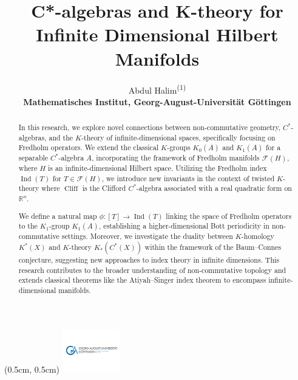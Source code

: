 \documentclass[11pt, twoside, a4paper]{article}
\title{C*-algebras and K-theory for Infinite Dimensional Hilbert Manifolds}
\author{Abdul Halim\textsuperscript{(1)} \\ \textbf{Mathematisches Institut, Georg-August-Universität Göttingen}}
\date{}
\theoremstyle{mytheoremstyle}
\begin{document}
    \begin{titlepage}
    \maketitle
\thispagestyle{titlepage}
    \begin{textblock*}{3cm}(0.5cm, 0.5cm) %
        \includegraphics[width=2.5cm]{uni-goettingen-logo.jpg} %
    \end{textblock*}
\end{titlepage}
\newpage
\vspace*{\fill}
\begin{abstract}
In this research, we explore novel connections between non-commutative geometry, $C^*$-algebras, and the $K$-theory of infinite-dimensional spaces, specifically focusing on Fredholm operators. We extend the classical $K$-groups $K_0(A)$ and $K_1(A)$ for a separable $C^*$-algebra $A$, incorporating the framework of Fredholm manifolds $\mathcal{F}(H)$, where $H$ is an infinite-dimensional Hilbert space. Utilizing the Fredholm index $\operatorname{Ind}(T)$ for $T \in \mathcal{F}(H)$, we introduce new invariants in the context of twisted $K$-theory where $\operatorname{Cliff}$ is the Clifford $C^*$-algebra associated with a real quadratic form on $\mathbb{R}^n$.

We define a natural map $\phi: [T] \to \operatorname{Ind}(T)$ linking the space of Fredholm operators to the $K_1$-group $K_1(A)$, establishing a higher-dimensional Bott periodicity in non-commutative settings. Moreover, we investigate the duality between $K$-homology $K^*(X)$ and $K$-theory $K_*(C^*(X))$ within the framework of the Baum--Connes conjecture, suggesting new approaches to index theory in infinite dimensions. This research contributes to the broader understanding of non-commutative topology and extends classical theorems like the Atiyah--Singer index theorem to encompass infinite-dimensional manifolds.
\end{abstract}
\vspace*{\fill}
\newpage

\thispagestyle{empty}
    \tableofcontents
\end{document}
